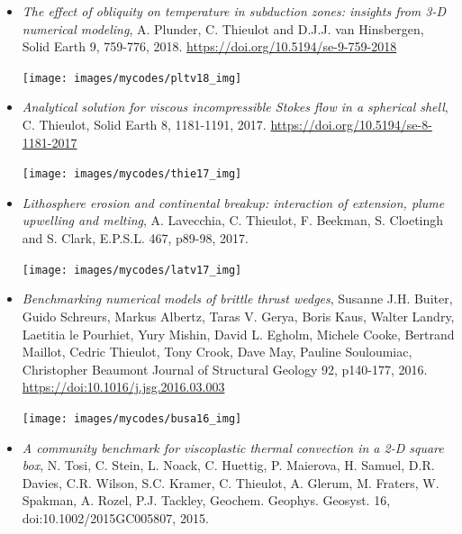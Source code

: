 \begin{itemize}
\item {\it The effect of obliquity on temperature in subduction zones: insights from 3-D numerical modeling}, 
A. Plunder, C. Thieulot and D.J.J. van Hinsbergen, Solid Earth 9, 759-776, 2018. \url{https://doi.org/10.5194/se-9-759-2018}

\begin{center}
\texttt{[image: images/mycodes/pltv18\_img]}
\end{center}


\item {\it Analytical solution for viscous incompressible Stokes flow in a spherical shell}, 
C. Thieulot, Solid Earth 8, 1181-1191, 2017. \url{https://doi.org/10.5194/se-8-1181-2017}

\begin{center}
\texttt{[image: images/mycodes/thie17\_img]}
\end{center}



\item  {\it Lithosphere erosion and continental breakup: interaction of extension, plume upwelling and melting}, 
A. Lavecchia, C. Thieulot, F. Beekman, S. Cloetingh and S. Clark, E.P.S.L. 467, p89-98, 2017.

\begin{center}
\texttt{[image: images/mycodes/latv17\_img]}
\end{center}


\item {\it Benchmarking numerical models of brittle thrust wedges}, 
Susanne J.H. Buiter, Guido Schreurs, Markus Albertz, Taras V. Gerya, Boris Kaus,
Walter Landry, Laetitia le Pourhiet, Yury Mishin, David L. Egholm, Michele Cooke,
Bertrand Maillot, Cedric Thieulot, Tony Crook, Dave May, Pauline Souloumiac, Christopher Beaumont
Journal of Structural Geology 92, p140-177, 2016. \url{https://doi:10.1016/j.jsg.2016.03.003}

\begin{center}
\texttt{[image: images/mycodes/busa16\_img]}
\end{center}


\item {\it A community benchmark for viscoplastic thermal convection in a 2-D square box}, 
N. Tosi, C. Stein, L. Noack, C. Huettig, P. Maierova, H. Samuel, D.R. Davies, C.R. Wilson, S.C. Kramer, C. Thieulot, A. Glerum, M. Fraters, W. Spakman, A. Rozel, P.J. Tackley, Geochem. Geophys. Geosyst. 16, doi:10.1002/2015GC005807, 2015.


\end{itemize}
